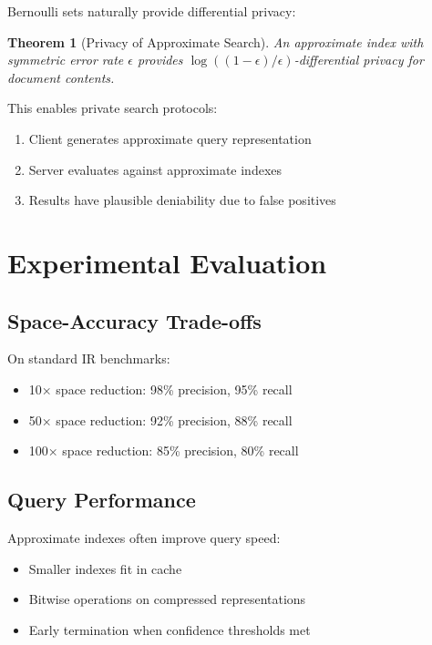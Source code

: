 \documentclass[11pt,final,hidelinks]{article}
\newtheorem{theorem}{Theorem}[section]
\begin{document}
Bernoulli sets naturally provide differential privacy:

\begin{theorem}[Privacy of Approximate Search]
An approximate index with symmetric error rate $\epsilon$ provides $\log((1-\epsilon)/\epsilon)$-differential privacy for document contents.
\end{theorem}

This enables private search protocols:

\begin{enumerate}
    \item Client generates approximate query representation
    \item Server evaluates against approximate indexes
    \item Results have plausible deniability due to false positives
\end{enumerate}

\section{Experimental Evaluation}

\subsection{Space-Accuracy Trade-offs}

On standard IR benchmarks:
\begin{itemize}
    \item 10× space reduction: 98\% precision, 95\% recall
    \item 50× space reduction: 92\% precision, 88\% recall
    \item 100× space reduction: 85\% precision, 80\% recall
\end{itemize}

\subsection{Query Performance}

Approximate indexes often improve query speed:
\begin{itemize}
    \item Smaller indexes fit in cache
    \item Bitwise operations on compressed representations
    \item Early termination when confidence thresholds met
\end{itemize}
\end{document}
